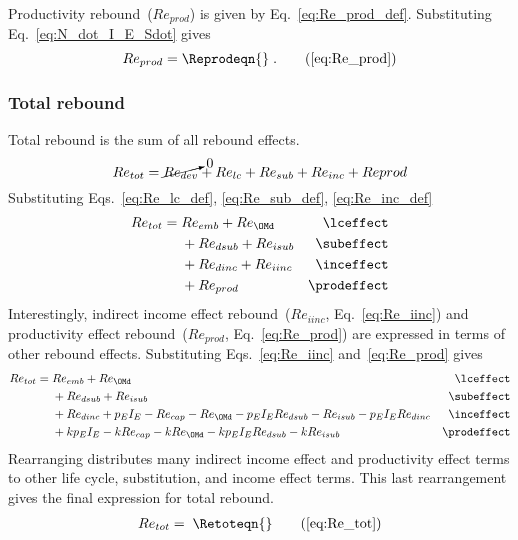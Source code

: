 \subsubsection{\Prodeffect{}} 
\label{sec:Re_prod}

Productivity rebound~($Re_{prod}$) is given by Eq.~\ref{eq:Re_prod_def}.
Substituting Eq.~\ref{eq:N_dot_I_E_Sdot} gives
%
\begin{equation}
  Re_{prod} = \Reprodeqn{} \; . \tag{\ref{eq:Re_prod}}
\end{equation}


\subsubsection{Total rebound} 
\label{sec:total_rebound}

Total rebound is the sum of all rebound effects.
%
\begin{equation}
  Re_{tot} = \cancelto{0}{Re_{dev}} + Re_{lc} + Re_{sub} + Re_{inc} + Re{prod}
\end{equation}
%
Substituting Eqs.~\ref{eq:Re_lc_def}, \ref{eq:Re_sub_def}, \ref{eq:Re_inc_def}
%
\begin{align}
  Re_{tot} = \; &Re_{emb} + Re_{\OMd}      & \mathrm{\lceffect}   \nonumber \\
                &+ Re_{dsub} + Re_{isub}   & \mathrm{\subeffect}  \nonumber \\
                &+ Re_{dinc} + Re_{iinc}   & \mathrm{\inceffect}  \nonumber \\
                &+ Re_{prod}               & \mathrm{\prodeffect}
\end{align}
%
Interestingly, 
indirect income effect rebound~($Re_{iinc}$, Eq.~\ref{eq:Re_iinc}) and
productivity effect rebound~($Re_{prod}$, Eq.~\ref{eq:Re_prod})
are expressed in terms of other rebound effects.
Substituting Eqs.~\ref{eq:Re_iinc} and~\ref{eq:Re_prod} gives
%
\begin{align}
  Re_{tot} = \; &Re_{emb} + Re_{\OMd}      & \mathrm{\lceffect}                             \nonumber \\
                &+ Re_{dsub} + Re_{isub}   & \mathrm{\subeffect}                            \nonumber \\
                &+ Re_{dinc} + p_E I_E - Re_{cap} - Re_{\OMd} - p_E I_E Re_{dsub} 
                             - Re_{isub} - p_E I_E Re_{dinc}   & \mathrm{\inceffect}        \nonumber \\
                &+ k p_E I_E - k Re_{cap} - k Re_{\OMd} - k p_E I_E Re_{dsub} - k Re_{isub}  & \mathrm{\prodeffect}
\end{align}
%
Rearranging distributes many indirect income effect and productivity effect terms 
to other life cycle, substitution, and income effect terms.
This last rearrangement gives the final expression for total rebound.
%
\begin{align}
  Re_{tot} = \; \Retoteqn{} \tag{\ref{eq:Re_tot}}
\end{align}

